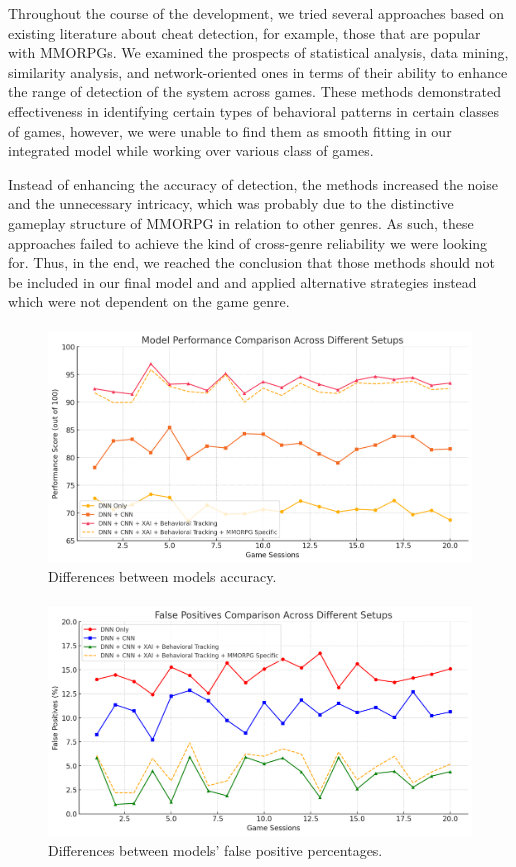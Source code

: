 Throughout the course of the development, we tried several approaches based on existing literature about cheat detection, for example, those that are popular with MMORPGs. We examined the prospects of statistical analysis, data mining, similarity analysis, and network-oriented ones in terms of their ability to enhance the range of detection of the system across games. These methods demonstrated effectiveness in identifying certain types of behavioral patterns in certain classes of games, however, we were unable to find them as smooth fitting in our integrated model while working over various class of games.

Instead of enhancing the accuracy of detection, the methods increased the noise and the unnecessary intricacy, which was probably due to the distinctive gameplay structure of MMORPG in relation to other genres. As such, these approaches failed to achieve the kind of cross-genre reliability we were looking for. Thus, in the end, we reached the conclusion that those methods should not be included in our final model and and applied alternative strategies instead which were not dependent on the game genre.
\paragraph{}

\begin{figure}
\centering
\includegraphics[width=0.8\linewidth]{images/model.png}
\caption{\label{fig:model}Differences between models accuracy.}
\end{figure}

\paragraph{}

\begin{figure}
\centering
\includegraphics[width=0.8\linewidth]{images/false-positive.png}
\caption{\label{fig:falsepositive}Differences between models' false positive percentages.}
\end{figure}
